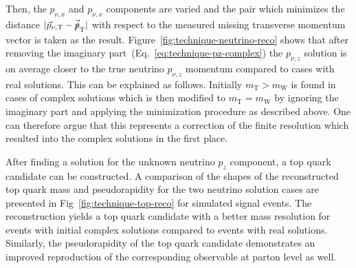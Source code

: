 Then, the $p_{\nu,x}$ and $p_{\nu,x}$ components are varied and the pair which minimizes the distance $|\vec{p}_{\nu,\mathrm{T}}-\vec{\slashed{p}}_\mathrm{T}|$ with respect to the measured missing transverse momentum vector is taken as the result. Figure~\ref{fig:technique-neutrino-reco} shows that after removing the imaginary part~(Eq.~\ref{eq:technique-pz-complex}) the $p_{\nu,z}$ solution is on average closer to the true neutrino $p_{\nu,z}$ momentum compared to cases with real solutions. This can be explained as follows. Initially $m_\mathrm{T}>m_\mathrm{W}$ is found in cases of complex solutions which is then modified to $m_\mathrm{T}=m_\mathrm{W}$ by ignoring the imaginary part and applying the minimization procedure as described above. One can therefore argue that this represents a correction of the finite \met resolution which resulted into the complex solutions in the first place.

After finding a solution for the unknown neutrino $p_{z}$ component, a top quark candidate can be constructed. A comparison of the shapes of the reconstructed top quark mass and pseudorapidity for the two neutrino solution cases are presented in Fig~\ref{fig:technique-top-reco} for simulated signal events. The reconstruction yields a top quark candidate with a better mass resolution for events with initial complex solutions compared to events with real solutions. Similarly, the pseudorapidity of the top quark candidate demonstrates an improved reproduction of the corresponding observable at parton level as well.



